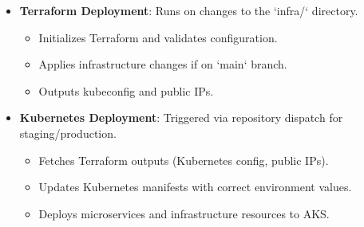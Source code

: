 \begin{itemize}
    \item \textbf{Terraform Deployment}: Runs on changes to the `infra/` directory.
    \begin{itemize}
        \item Initializes Terraform and validates configuration.
        \item Applies infrastructure changes if on `main` branch.
        \item Outputs kubeconfig and public IPs.
    \end{itemize}
    \item \textbf{Kubernetes Deployment}: Triggered via repository dispatch for staging/production.
    \begin{itemize}
        \item Fetches Terraform outputs (Kubernetes config, public IPs).
        \item Updates Kubernetes manifests with correct environment values.
        \item Deploys microservices and infrastructure resources to AKS.
    \end{itemize}
\end{itemize}
